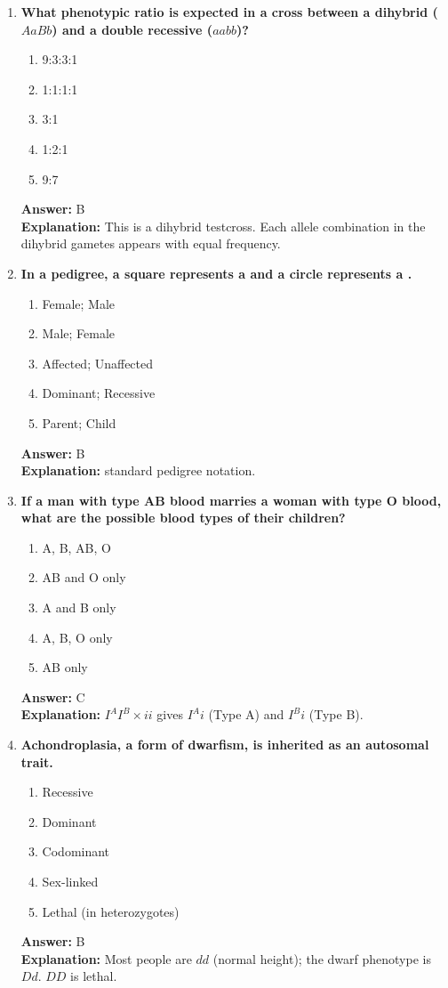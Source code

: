 \documentclass[11pt, a4paper]{article}
\begin{document}
\begin{enumerate}[leftmargin=*, label=\arabic*.]
\item \textbf{What phenotypic ratio is expected in a cross between a dihybrid ($AaBb$) and a double recessive ($aabb$)?}
\begin{enumerate}[label=\Alph*.]
\item 9:3:3:1
\item 1:1:1:1
\item 3:1
\item 1:2:1
\item 9:7
\end{enumerate}
\textbf{Answer:} B \\
\textbf{Explanation:} This is a dihybrid testcross. Each allele combination in the dihybrid gametes appears with equal frequency.

\item \textbf{In a pedigree, a square represents a \underline{\hspace{1cm}} and a circle represents a \underline{\hspace{1cm}}.}
\begin{enumerate}[label=\Alph*.]
\item Female; Male
\item Male; Female
\item Affected; Unaffected
\item Dominant; Recessive
\item Parent; Child
\end{enumerate}
\textbf{Answer:} B \\
\textbf{Explanation:} standard pedigree notation.

\item \textbf{If a man with type AB blood marries a woman with type O blood, what are the possible blood types of their children?}
\begin{enumerate}[label=\Alph*.]
\item A, B, AB, O
\item AB and O only
\item A and B only
\item A, B, O only
\item AB only
\end{enumerate}
\textbf{Answer:} C \\
\textbf{Explanation:} $I^A I^B \times ii$ gives $I^A i$ (Type A) and $I^B i$ (Type B).

\item \textbf{Achondroplasia, a form of dwarfism, is inherited as an autosomal \underline{\hspace{1cm}} trait.}
\begin{enumerate}[label=\Alph*.]
\item Recessive
\item Dominant
\item Codominant
\item Sex-linked
\item Lethal (in heterozygotes)
\end{enumerate}
\textbf{Answer:} B \\
\textbf{Explanation:} Most people are $dd$ (normal height); the dwarf phenotype is $Dd$. $DD$ is lethal.


\end{enumerate}
\end{document}
